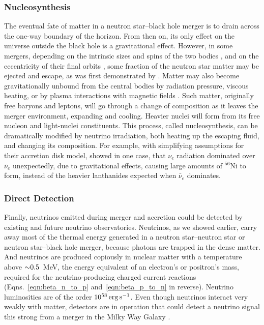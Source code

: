 \subsubsection{Nucleosynthesis}
\label{sssc:nucleosynthesis}
The eventual fate of matter in a neutron star--black hole merger is to drain
across the one-way boundary of the horizon. From then on, its only effect on
the universe outside the black hole is a gravitational effect.
However, in some mergers, depending on the intrinsic sizes and spins of the
two bodies \citep{kyut2015-ejecta}, and on the eccentricity of
their final orbits \citep{east2012-eccentric,ross2012-ejecta},
some fraction of the neutron star matter may be ejected and escape, as was first
demonstrated by \citet{latt1974-bhns_ejecta}. Matter may
also become gravitationally unbound from the central bodies by 
radiation pressure, viscous heating, or by plasma interactions with
magnetic fields \citep{just2015-nucleosynthesis}.
Such matter, originally free baryons and leptons, will go through a change of
composition as it leaves the merger environment, expanding and cooling.
Heavier nuclei will form from its free nucleon and light-nuclei constituents.
This process, called nucleosynthesis, can be dramatically modified by neutrino
irradiation, both heating up the escaping fluid, and changing its composition.
For example, with simplifying assumptions for their accretion disk model,
\citet{surm2014-nickel_56}
showed in one case, that $\nu_e$ radiation dominated over $\bar{\nu}_e$
unexpectedly, due to gravitational effects,
causing large amounts of $^{56}$Ni to form, instead of the
heavier lanthanides expected when $\bar{\nu}_e$ dominates.

\subsubsection{Direct Detection}
\label{sssc:nu_detection}
Finally, neutrinos emitted during merger and accretion could be detected by
existing and future neutrino observatories. Neutrinos, as we showed earlier,
carry away most of the thermal energy generated in a neutron star--neutron star
\nsns or neutron star--black hole \nsbh merger, because photons are trapped in
the dense matter. And neutrinos are produced copiously in nuclear matter with
a temperature above $\mathord{\sim}0.5$~MeV,
the energy equivalent of an electron's or positron's mass,
required for the neutrino-producing charged current reactions
(Eqns.~\ref{eqn:beta_n_to_p} and~\ref{eqn:beta_p_to_n} in reverse).
Neutrino luminosities are of the order $10^{53}\,{\rm erg\,s}^{-1}$. Even
though neutrinos interact very weakly with matter, detectors are in operation
that could detect a neutrino signal this strong from a merger in the
Milky Way Galaxy \citep{caba2009-detecting_grb_nu}.

